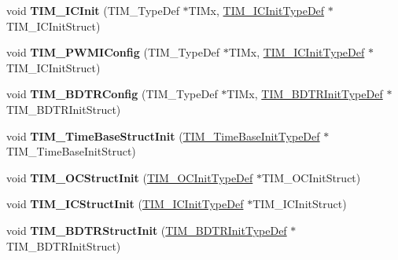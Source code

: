 \begin{DoxyCompactItemize}
\item 
\hypertarget{group__TIM__Exported__Functions_ga9e6a153dd6552e4e1188eba227316f7f}{
void {\bfseries TIM\_\-ICInit} (TIM\_\-TypeDef $\ast$TIMx, \hyperlink{structTIM__ICInitTypeDef}{TIM\_\-ICInitTypeDef} $\ast$TIM\_\-ICInitStruct)}
\label{group__TIM__Exported__Functions_ga9e6a153dd6552e4e1188eba227316f7f}

\item 
\hypertarget{group__TIM__Exported__Functions_gaa71f9296556310f85628d6c748a06475}{
void {\bfseries TIM\_\-PWMIConfig} (TIM\_\-TypeDef $\ast$TIMx, \hyperlink{structTIM__ICInitTypeDef}{TIM\_\-ICInitTypeDef} $\ast$TIM\_\-ICInitStruct)}
\label{group__TIM__Exported__Functions_gaa71f9296556310f85628d6c748a06475}

\item 
\hypertarget{group__TIM__Exported__Functions_ga3df4ba3f0727f63ce621e2b2e6035d4f}{
void {\bfseries TIM\_\-BDTRConfig} (TIM\_\-TypeDef $\ast$TIMx, \hyperlink{structTIM__BDTRInitTypeDef}{TIM\_\-BDTRInitTypeDef} $\ast$TIM\_\-BDTRInitStruct)}
\label{group__TIM__Exported__Functions_ga3df4ba3f0727f63ce621e2b2e6035d4f}

\item 
\hypertarget{group__TIM__Exported__Functions_ga1556a0b9a5d53506875fd7de0cbc6b1f}{
void {\bfseries TIM\_\-TimeBaseStructInit} (\hyperlink{structTIM__TimeBaseInitTypeDef}{TIM\_\-TimeBaseInitTypeDef} $\ast$TIM\_\-TimeBaseInitStruct)}
\label{group__TIM__Exported__Functions_ga1556a0b9a5d53506875fd7de0cbc6b1f}

\item 
\hypertarget{group__TIM__Exported__Functions_ga394683c78ae02837882e36014e11643e}{
void {\bfseries TIM\_\-OCStructInit} (\hyperlink{structTIM__OCInitTypeDef}{TIM\_\-OCInitTypeDef} $\ast$TIM\_\-OCInitStruct)}
\label{group__TIM__Exported__Functions_ga394683c78ae02837882e36014e11643e}

\item 
\hypertarget{group__TIM__Exported__Functions_ga5005dac8e4e8a4c7fc2a0ef05b77cc50}{
void {\bfseries TIM\_\-ICStructInit} (\hyperlink{structTIM__ICInitTypeDef}{TIM\_\-ICInitTypeDef} $\ast$TIM\_\-ICInitStruct)}
\label{group__TIM__Exported__Functions_ga5005dac8e4e8a4c7fc2a0ef05b77cc50}

\item 
\hypertarget{group__TIM__Exported__Functions_gaea0f49938cda8ae0738162194798afc6}{
void {\bfseries TIM\_\-BDTRStructInit} (\hyperlink{structTIM__BDTRInitTypeDef}{TIM\_\-BDTRInitTypeDef} $\ast$TIM\_\-BDTRInitStruct)}
\label{group__TIM__Exported__Functions_gaea0f49938cda8ae0738162194798afc6}


\end{DoxyCompactItemize}
